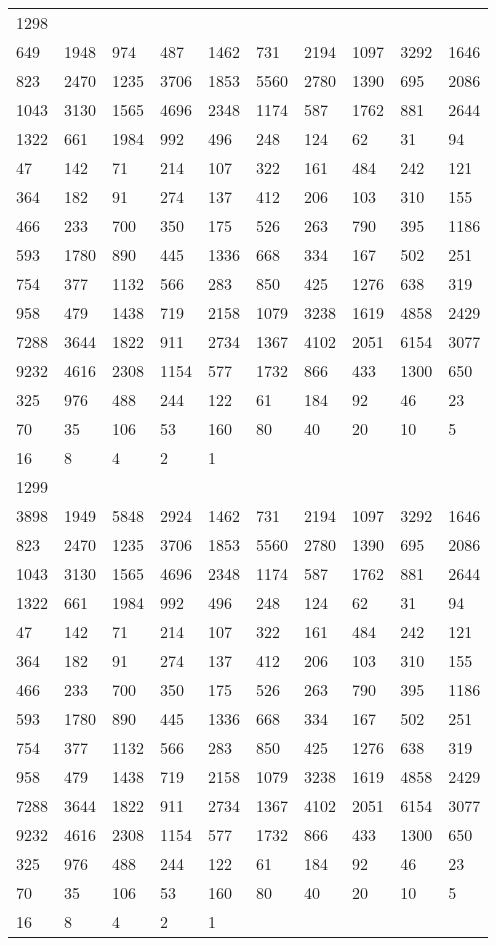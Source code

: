\begin{longtable}{*{10}{l}}
1298&&&&&&&&&\\
649& 1948& 974& 487& 1462& 731& 2194& 1097& 3292& 1646\\
823& 2470& 1235& 3706& 1853& 5560& 2780& 1390& 695& 2086\\
1043& 3130& 1565& 4696& 2348& 1174& 587& 1762& 881& 2644\\
1322& 661& 1984& 992& 496& 248& 124& 62& 31& 94\\
47& 142& 71& 214& 107& 322& 161& 484& 242& 121\\
364& 182& 91& 274& 137& 412& 206& 103& 310& 155\\
466& 233& 700& 350& 175& 526& 263& 790& 395& 1186\\
593& 1780& 890& 445& 1336& 668& 334& 167& 502& 251\\
754& 377& 1132& 566& 283& 850& 425& 1276& 638& 319\\
958& 479& 1438& 719& 2158& 1079& 3238& 1619& 4858& 2429\\
7288& 3644& 1822& 911& 2734& 1367& 4102& 2051& 6154& 3077\\
9232& 4616& 2308& 1154& 577& 1732& 866& 433& 1300& 650\\
325& 976& 488& 244& 122& 61& 184& 92& 46& 23\\
70& 35& 106& 53& 160& 80& 40& 20& 10& 5\\
16& 8& 4& 2& 1& \\

1299&&&&&&&&&\\
3898& 1949& 5848& 2924& 1462& 731& 2194& 1097& 3292& 1646\\
823& 2470& 1235& 3706& 1853& 5560& 2780& 1390& 695& 2086\\
1043& 3130& 1565& 4696& 2348& 1174& 587& 1762& 881& 2644\\
1322& 661& 1984& 992& 496& 248& 124& 62& 31& 94\\
47& 142& 71& 214& 107& 322& 161& 484& 242& 121\\
364& 182& 91& 274& 137& 412& 206& 103& 310& 155\\
466& 233& 700& 350& 175& 526& 263& 790& 395& 1186\\
593& 1780& 890& 445& 1336& 668& 334& 167& 502& 251\\
754& 377& 1132& 566& 283& 850& 425& 1276& 638& 319\\
958& 479& 1438& 719& 2158& 1079& 3238& 1619& 4858& 2429\\
7288& 3644& 1822& 911& 2734& 1367& 4102& 2051& 6154& 3077\\
9232& 4616& 2308& 1154& 577& 1732& 866& 433& 1300& 650\\
325& 976& 488& 244& 122& 61& 184& 92& 46& 23\\
70& 35& 106& 53& 160& 80& 40& 20& 10& 5\\
16& 8& 4& 2& 1& \\


\end{longtable}
